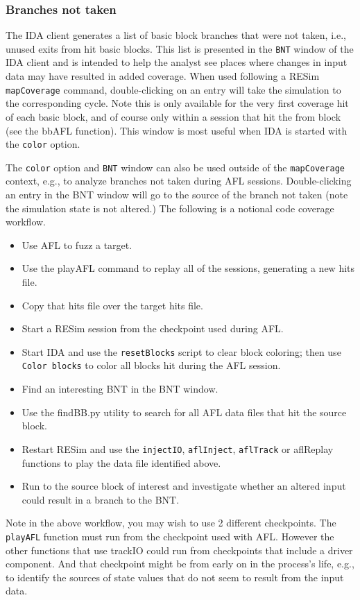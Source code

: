 \documentclass[titlepage]{article}
\begin{document}
\subsubsection{Branches not taken}
\label{BNT}
The IDA client generates a list of basic block branches that were not taken, i.e., unused exits from hit basic blocks.  This list is presented in the {\tt BNT} window of the IDA client
and is intended to help the analyst see places where changes in input data may have resulted in added coverage.  When used following a
RESim {\tt mapCoverage} command, double-clicking on an entry will take the simulation to the corresponding 
cycle.  Note this is only available for the very first coverage hit of each basic block, and of course only within a session that hit the from block (see the bbAFL function).  This window is most useful when IDA is started with the {\tt color} option.

The {\tt color} option and {\tt BNT} window can also be used outside of the {\tt mapCoverage} context, e.g., to analyze branches not 
taken during AFL sessions.  Double-clicking an entry in the BNT window will go to the source of the branch not taken (note the simulation state
is not altered.)  The following is a notional code coverage workflow.
\begin{itemize}
\item Use AFL to fuzz a target.
\item Use the playAFL command to replay all of the sessions, generating a new hits file.
\item Copy that hits file over the target hits file.
\item Start a RESim session from the checkpoint used during AFL.
\item Start IDA and use the {\tt resetBlocks} script to clear block coloring; then use {\tt Color blocks} to color all blocks hit
during the AFL session.
\item Find an interesting BNT in the BNT window.
\item Use the findBB.py utility to search for all AFL data files that hit the source block.
\item Restart RESim and use the {\tt injectIO}, {\tt aflInject}, {\tt aflTrack} or {aflReplay} functions to play the data file identified above.
\item Run to the source block of interest and investigate whether an altered input could result in a branch to the BNT.
\end{itemize}
Note in the above workflow, you may wish to use 2 different checkpoints.  The {\tt playAFL} function must run from the
checkpoint used with AFL.  However the other functions that use trackIO could run from checkpoints that include a driver component.  And 
that checkpoint might be from early on in the process's life, e.g., to identify the sources of state values that do not seem to result from
the input data.
\end{document}
